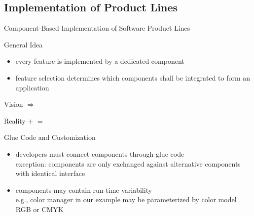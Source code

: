 \subsection{Implementation of Product Lines}
\begin{frame}{Component-Based Implementation of Software Product Lines} %
	\begin{mycolumns}[t,widths={40}]
		\begin{definition}{General Idea}					
			\begin{itemize}
				\item every feature is implemented by a dedicated component
				\item feature selection determines which components shall be integrated to form an application
			\end{itemize}
		\end{definition}
		\begin{example}{Vision}
				\vspace*{\fill}
					$\Longrightarrow$ 
				\vspace*{\fill}	
		\end{example}
	\mynextcolumn
		\begin{example}{Reality}
				\vspace*{\fill}
					$+$ 
				\vspace*{\fill}	
				\vspace*{\fill}
					$=$ 
				\vspace*{\fill}	
		\end{example}		
		\begin{note}{Glue Code and Customization}
			\begin{itemize}
				\item developers must connect components through glue code\\exception: components are only exchanged against alternative components with identical interface
				\item components may contain run-time variability\\e.g., color manager in our example may be parameterized by color model RGB or CMYK
			\end{itemize}
		\end{note}
	\end{mycolumns}	
\end{frame}

